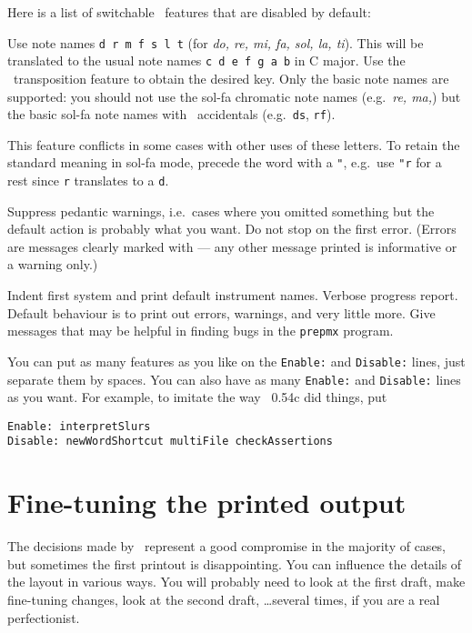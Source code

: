 \documentclass[11pt]{article}
\begin{document}
Here is a list of switchable \MTx\ features that are 
disabled by default:

\begin{description}
   Use  
  note names \texttt{d r m f s l t} (for \emph{do, re, mi, fa, sol, la, ti}).
  This will be translated to the usual note names \texttt{c d e f g a b} 
  in C major.  Use the \PMX\ transposition feature to obtain the desired
  key.  Only the basic note names are supported: you should not use the 
  sol-fa chromatic note names (e.g.\ \emph{re, ma,}) but the basic sol-fa
  note names with \PMX\ accidentals (e.g.\ \texttt{ds}, \texttt{rf}).  

  This feature conflicts in some cases with other uses of these letters.
  To retain the standard meaning in sol-fa mode, precede the word with a 
  \verb'"', e.g.\ use \verb'"r' for a rest since \verb'r' translates to
  a \verb'd'.

    Suppress pedantic warnings, i.e.\ cases where
you omitted something but the default action is probably what you want.
   Do not stop on the first error.   
(Errors are messages clearly marked with  --- 
any other message printed is informative or a warning only.)

    Indent first system and print default 
   instrument names.
   Verbose progress report.  Default behaviour is 
to print out errors, warnings, and very little more.
    Give messages that may be helpful in finding bugs
in the \texttt{prepmx} program.
\end{description}

You can put as many features as you like on the \texttt{Enable:}
and \texttt{Disable:} lines, just separate them by spaces.  You can 
also have as many \texttt{Enable:} and \texttt{Disable:} lines as you want.
For example, to imitate the way \MTx\ 0.54c did things, put
\begin{verbatim}
Enable: interpretSlurs
Disable: newWordShortcut multiFile checkAssertions
\end{verbatim}

\section{Fine-tuning the printed output}

The decisions made by \PMX\ represent a good compromise in the majority 
of cases, but sometimes the first printout is disappointing.  You can 
influence the details of the layout in various ways.  You will probably 
need to look at the first draft, make fine-tuning changes, look at the 
second draft, \dots several times, if you are a real perfectionist.
\end{document}
